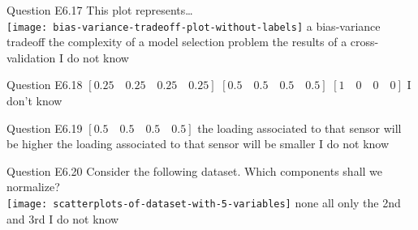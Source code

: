 \begin{frame}{Question E6.17}
	\QuestionBody
	{
		This plot represents\ldots \vspace{0.2cm} \\
		\centering
		\texttt{[image: bias-variance-tradeoff-plot-without-labels]}
	}
	\QuestionAnswers
	{
		\correctanswer a bias-variance tradeoff
		\answer the complexity of a model selection problem
		\answer the results of a cross-validation
		\answer I do not know
	}
	\QuestionSolution{}
\end{frame}


\begin{frame}{Question E6.18}
	\QuestionAnswers
	{
		\answer $[0.25 \quad 0.25 \quad 0.25 \quad 0.25]$
		\correctanswer $[0.5 \quad 0.5 \quad 0.5 \quad 0.5]$
		\answer $[1 \quad 0 \quad 0 \quad 0]$
		\answer I don't know
	}
\end{frame}


\begin{frame}{Question E6.19}
	\QuestionAnswers
	{
        \answer $[0.5 \quad 0.5 \quad 0.5 \quad 0.5]$
        \correctanswer the loading associated to that sensor will be higher
        \answer the loading associated to that sensor will be smaller
		\answer I do not know
	}
	\QuestionSolution{}
\end{frame}


\begin{frame}{Question E6.20}
	\QuestionBody
	{
		Consider the following dataset. Which components shall we normalize? \vspace{0.1cm} \\
		\centering
		\texttt{[image: scatterplots-of-dataset-with-5-variables]}
		\vspace{-2cm}
	}
	\QuestionAnswers
	{
		\answer none
		\correctanswer all
		\answer only the 2nd and 3rd
		\answer I do not know
	}
	\QuestionSolution{}
\end{frame}


